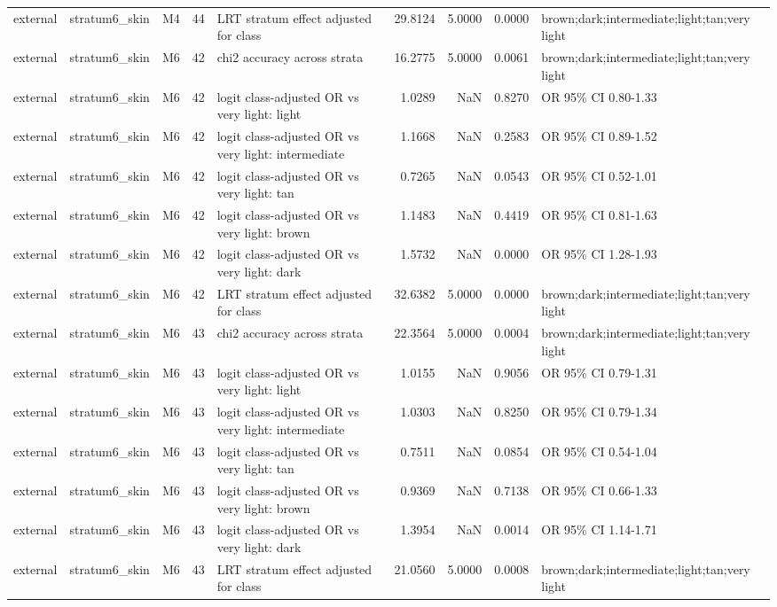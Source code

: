 \begin{tabular}{lllrlrrrl}
external & stratum6\_skin & M4 & 44 & LRT stratum effect adjusted for class & 29.8124 & 5.0000 & 0.0000 & brown;dark;intermediate;light;tan;very light \\
external & stratum6\_skin & M6 & 42 & chi2 accuracy across strata & 16.2775 & 5.0000 & 0.0061 & brown;dark;intermediate;light;tan;very light \\
external & stratum6\_skin & M6 & 42 & logit class-adjusted OR vs very light: light & 1.0289 & NaN & 0.8270 & OR 95\% CI 0.80-1.33 \\
external & stratum6\_skin & M6 & 42 & logit class-adjusted OR vs very light: intermediate & 1.1668 & NaN & 0.2583 & OR 95\% CI 0.89-1.52 \\
external & stratum6\_skin & M6 & 42 & logit class-adjusted OR vs very light: tan & 0.7265 & NaN & 0.0543 & OR 95\% CI 0.52-1.01 \\
external & stratum6\_skin & M6 & 42 & logit class-adjusted OR vs very light: brown & 1.1483 & NaN & 0.4419 & OR 95\% CI 0.81-1.63 \\
external & stratum6\_skin & M6 & 42 & logit class-adjusted OR vs very light: dark & 1.5732 & NaN & 0.0000 & OR 95\% CI 1.28-1.93 \\
external & stratum6\_skin & M6 & 42 & LRT stratum effect adjusted for class & 32.6382 & 5.0000 & 0.0000 & brown;dark;intermediate;light;tan;very light \\
external & stratum6\_skin & M6 & 43 & chi2 accuracy across strata & 22.3564 & 5.0000 & 0.0004 & brown;dark;intermediate;light;tan;very light \\
external & stratum6\_skin & M6 & 43 & logit class-adjusted OR vs very light: light & 1.0155 & NaN & 0.9056 & OR 95\% CI 0.79-1.31 \\
external & stratum6\_skin & M6 & 43 & logit class-adjusted OR vs very light: intermediate & 1.0303 & NaN & 0.8250 & OR 95\% CI 0.79-1.34 \\
external & stratum6\_skin & M6 & 43 & logit class-adjusted OR vs very light: tan & 0.7511 & NaN & 0.0854 & OR 95\% CI 0.54-1.04 \\
external & stratum6\_skin & M6 & 43 & logit class-adjusted OR vs very light: brown & 0.9369 & NaN & 0.7138 & OR 95\% CI 0.66-1.33 \\
external & stratum6\_skin & M6 & 43 & logit class-adjusted OR vs very light: dark & 1.3954 & NaN & 0.0014 & OR 95\% CI 1.14-1.71 \\
external & stratum6\_skin & M6 & 43 & LRT stratum effect adjusted for class & 21.0560 & 5.0000 & 0.0008 & brown;dark;intermediate;light;tan;very light \\

\end{tabular}
